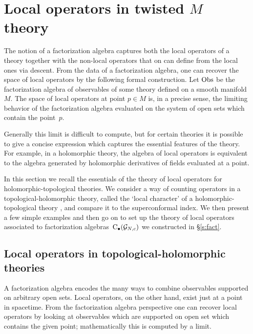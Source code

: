 %
%
%

\section{Local operators in twisted $M$ theory}

The notion of a factorization algebra captures both the local operators of a theory together with the non-local operators that on can define from the local ones via descent.
From the data of a factorization algebra, one can recover the space of local operators by the following formal construction. 
Let $\operatorname{Obs}$ be the factorization algebra of observables of some theory defined on a smooth manifold $M$.
The space of local operators at point $p \in M$ is, in a precise sense, the limiting behavior of the factorization algebra evaluated on the system of open sets which contain the point~$p$. 

Generally this limit is difficult to compute, but for certain theories it is possible to give a concise expression which captures the essential features of the theory.
For example, in a holomorphic theory, the algebra of local operators is equivalent to the algebra generated by holomorphic derivatives of fields evaluated at a point.

In this section we recall the essentials of the theory of local operators for holomorphic-topological theories. 
We consider a way of counting operators in a topological-holomorphic theory, called the `local character' of a holomorphic-topological theory \cite{SWchar}, and compare it to the superconformal index.
We then present a few simple examples and then go on to set up the theory of local operators associated to factorization algebras~${\rm C}_\bullet(\mathcal G_{N,c})$ we constructed in \S \ref{s:fact}.

\subsection{Local operators in topological-holomorphic theories}

A factorization algebra encodes the many ways to combine observables supported on arbitrary open sets. 
Local operators, on the other hand, exist just at a point in spacetime.
From the factorization algebra perspective one can recover local operators by looking at observables which are supported on  open set which contains the given point; mathematically this is computed by a limit. 

